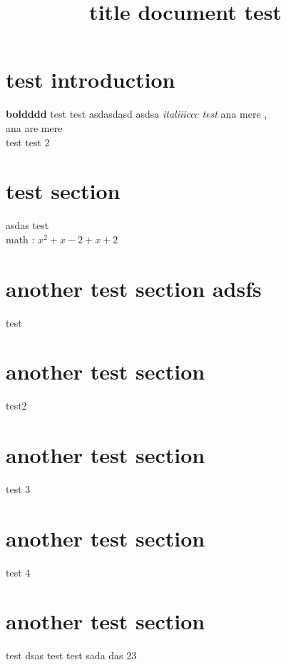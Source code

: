 \documentclass{article}
\title{title document test}
\begin{document}
\section{test introduction}

\textbf{boldddd}
test test asdasdasd \hspace asdsa \textit{italiiiccc test}
ana mere , \\ ana are mere\\
test test 2\\

\section{test section}
asdas \hspace test
\\
math : $ x ^ 2 + x - 2 + x + 2 $

\section{another test section adsfs}
test

\section{another test section}
test2

\section{another test section}
test 3

\section{another test section}
test 4

\section{another test section}
test dsas test test sada das 23
\end{document}
